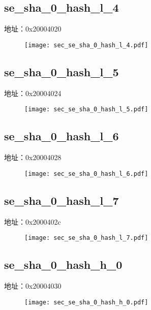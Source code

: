 \subsection{se\_sha\_0\_hash\_l\_4}
\label{sec-se-sha-0-hash-l-4}
地址：0x20004020
 \begin{figure}[H]
\texttt{[image: sec\_se\_sha\_0\_hash\_l\_4.pdf]}
\end{figure}

\subsection{se\_sha\_0\_hash\_l\_5}
\label{sec-se-sha-0-hash-l-5}
地址：0x20004024
 \begin{figure}[H]
\texttt{[image: sec\_se\_sha\_0\_hash\_l\_5.pdf]}
\end{figure}

\subsection{se\_sha\_0\_hash\_l\_6}
\label{sec-se-sha-0-hash-l-6}
地址：0x20004028
 \begin{figure}[H]
\texttt{[image: sec\_se\_sha\_0\_hash\_l\_6.pdf]}
\end{figure}

\subsection{se\_sha\_0\_hash\_l\_7}
\label{sec-se-sha-0-hash-l-7}
地址：0x2000402c
 \begin{figure}[H]
\texttt{[image: sec\_se\_sha\_0\_hash\_l\_7.pdf]}
\end{figure}

\subsection{se\_sha\_0\_hash\_h\_0}
\label{sec-se-sha-0-hash-h-0}
地址：0x20004030
 \begin{figure}[H]
\texttt{[image: sec\_se\_sha\_0\_hash\_h\_0.pdf]}
\end{figure}

